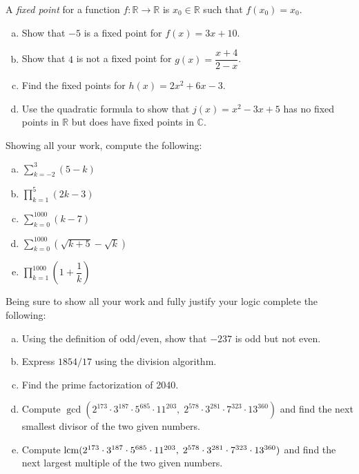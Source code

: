 \documentclass[12pt,letterpaper]{exam}
\begin{document}
\begin{questions}
\newpage
\question[10] A \textit{fixed point} for a function $f: \mathbb{R} \to \mathbb{R}$ is $x_0 \in \mathbb{R}$ such that $f(x_0)= x_0$. 
	\begin{enumerate}[(a)]
	\item Show that $-5$ is a fixed point for $f(x)= 3x + 10$.
	\item Show that $4$ is not a fixed point for $g(x)= \dfrac{x + 4}{2 - x}$.
	\item Find the fixed points for $h(x)= 2x^2 + 6x - 3$. 
	\item Use the quadratic formula to show that $j(x)= x^2 - 3x + 5$ has no fixed points in $\mathbb{R}$ but does have fixed points in $\mathbb{C}$. 
	\end{enumerate}



\newpage
\question[10] Showing all your work, compute the following:
	\begin{enumerate}[(a)]
	\item $\displaystyle \sum_{k= -2}^3 (5 - k)$
	\item $\displaystyle \prod_{k=1}^5 (2k -3)$ 
	\item $\displaystyle \sum_{k=0}^{1000} (k - 7)$
	\item $\displaystyle \sum_{k=0}^{1000} \left( \sqrt{k + 5} - \sqrt{k} \right)$
	\item $\displaystyle \prod_{k=1}^{1000} \left(1 + \dfrac{1}{k} \right)$
	\end{enumerate}



\newpage
\question[10] Being sure to show all your work and fully justify your logic complete the following:
	\begin{enumerate}[(a)]
	\item Using the definition of odd/even, show that $-237$ is odd but not even.
	\item Express $1854/17$ using the division algorithm. 
	\item Find the prime factorization of 2040. 
	\item Compute $\gcd(2^{173} \cdot 3^{187} \cdot 5^{685} \cdot 11^{203}, \; 2^{578} \cdot 3^{281} \cdot 7^{323} \cdot 13^{360})$ and find the next smallest divisor of the two given numbers. 
	\item Compute $\operatorname{lcm}(2^{173} \cdot 3^{187} \cdot 5^{685} \cdot 11^{203}, \; 2^{578} \cdot 3^{281} \cdot 7^{323} \cdot 13^{360})$ and find the next largest multiple of the two given numbers.
	\end{enumerate}




\end{questions}
\end{document}
